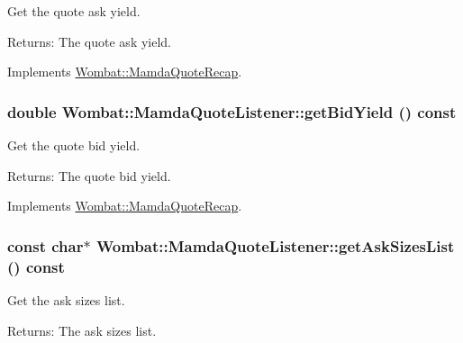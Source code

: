 Get the quote ask yield. 

\begin{Desc}
\item[Returns:]The quote ask yield. \end{Desc}


Implements \hyperlink{classWombat_1_1MamdaQuoteRecap_2c27e50701aa2a56fa132d81a6b4be42}{Wombat::Mamda\-Quote\-Recap}.\hypertarget{classWombat_1_1MamdaQuoteListener_17999949e20889d0d319e71874949d25}{
\subsubsection[getBidYield]{\setlength{\rightskip}{0pt plus 5cm}double Wombat::Mamda\-Quote\-Listener::get\-Bid\-Yield () const}}
\label{classWombat_1_1MamdaQuoteListener_17999949e20889d0d319e71874949d25}


Get the quote bid yield. 

\begin{Desc}
\item[Returns:]The quote bid yield. \end{Desc}


Implements \hyperlink{classWombat_1_1MamdaQuoteRecap_29c021892c5abee2c716d01f15b7b6fe}{Wombat::Mamda\-Quote\-Recap}.\hypertarget{classWombat_1_1MamdaQuoteListener_9aa5070318fdfb0cc239fb6f11e286c0}{
\subsubsection[getAskSizesList]{\setlength{\rightskip}{0pt plus 5cm}const char$\ast$ Wombat::Mamda\-Quote\-Listener::get\-Ask\-Sizes\-List () const}}
\label{classWombat_1_1MamdaQuoteListener_9aa5070318fdfb0cc239fb6f11e286c0}


Get the ask sizes list. 

\begin{Desc}
\item[Returns:]The ask sizes list. \end{Desc}


